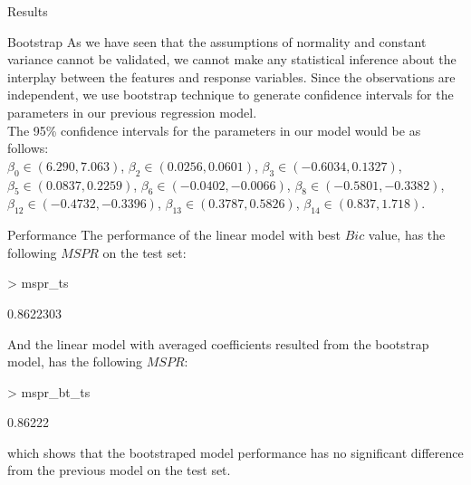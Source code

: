 \documentclass[a4paper,11pt]{article}
\begin{document}
\begin{section}{Results}
\begin{subsection}{Bootstrap}
As we have seen that the assumptions of normality and constant variance cannot be validated, we cannot make any statistical inference about the interplay between the features and response variables. Since the observations are independent, we use bootstrap technique to generate confidence intervals for the parameters in our previous regression model.\\
The 95\% confidence intervals for the parameters in our model would be as follows:\\
$\beta_0 \in (6.290, 7.063)$, $\beta_2 \in (0.0256, 0.0601)$, $\beta_3 \in (-0.6034, 0.1327)$, $\beta_5 \in ( 0.0837,  0.2259 )$, $\beta_6 \in  (-0.0402, -0.0066)$, $\beta_8 \in (-0.5801, -0.3382 )$, $\beta_{12} \in (-0.4732, -0.3396 )$, $\beta_{13} \in ( 0.3787,  0.5826 )$, $\beta_{14} \in ( 0.837,  1.718)$.
\end{subsection}
\begin{subsection}{Performance}
The performance of the linear model with best $Bic$ value, has the following $MSPR$ on the test set:
\begin{Schunk}
\begin{Sinput}
> mspr_ts
\end{Sinput}
\begin{Soutput}
[1] 0.8622303
\end{Soutput}
\end{Schunk}
And the linear model with averaged coefficients resulted from the bootstrap model, has the following $MSPR$:
\begin{Schunk}
\begin{Sinput}
> mspr_bt_ts
\end{Sinput}
\begin{Soutput}
[1] 0.86222
\end{Soutput}
\end{Schunk}
which shows that the bootstraped model performance has no significant difference from the previous model on the test set.
\end{subsection}
\end{section}
\end{document}
